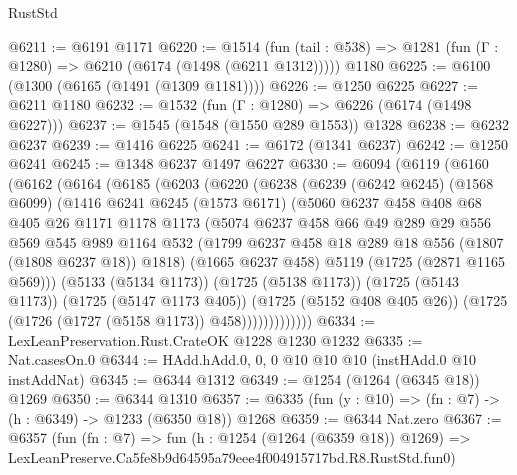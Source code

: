 \begin{lexlean}{RustStd}
\begin{coremodule}
@6211 := @6191 @1171
@6220 := @1514
    (fun (tail : @538) => @1281 (fun (Γ : @1280) => @6210 (@6174 (@1498 (@6211 @1312)))))
    @1180
@6225 := @6100 (@1300 (@6165 (@1491 (@1309 @1181))))
@6226 := @1250 @6225
@6227 := @6211 @1180
@6232 := @1532 (fun (Γ : @1280) => @6226 (@6174 (@1498 @6227)))
@6237 := @1545 (@1548 (@1550 @289 @1553)) @1328
@6238 := @6232 @6237
@6239 := @1416 @6225
@6241 := @6172 (@1341 @6237)
@6242 := @1250 @6241
@6245 := @1348 @6237 @1497 @6227
@6330 := @6094
    (@6119
      (@6160
        (@6162
          (@6164
            (@6185
              (@6203
                (@6220
                  (@6238
                    (@6239
                      (@6242 @6245)
                      (@1568 @6099)
                      (@1416
                        @6241
                        @6245
                        (@1573 @6171)
                        (@5060
                          @6237
                          @458
                          @408
                          @68
                          @405
                          @26
                          @1171
                          @1178
                          @1173
                          (@5074
                            @6237
                            @458
                            @66
                            @49
                            @289
                            @29
                            @556
                            @569
                            @545
                            @989
                            @1164
                            @532
                            (@1799 @6237 @458 @18 @289 @18 @556 (@1807 (@1808 @6237 @18)) @1818)
                            (@1665 @6237 @458)
                            @5119
                            (@1725 (@2871 @1165 @569)))
                          (@5133 (@5134 @1173))
                          (@1725 (@5138 @1173))
                          (@1725 (@5143 @1173))
                          (@1725 (@5147 @1173 @405))
                          (@1725 (@5152 @408 @405 @26))
                          (@1725 (@1726 (@1727 (@5158 @1173)) @458)))))))))))))
@6334 := LexLeanPreservation.Rust.CrateOK @1228 @1230 @1232
@6335 := Nat.casesOn.{0}
@6344 := HAdd.hAdd.{0, 0, 0} @10 @10 @10 (instHAdd.{0} @10 instAddNat)
@6345 := @6344 @1312
@6349 := @1254 (@1264 (@6345 @18)) @1269
@6350 := @6344 @1310
@6357 := @6335 (fun (y : @10) => (fn : @7) -> (h : @6349) -> @1233 (@6350 @18)) @1268
@6359 := @6344 Nat.zero
@6367 := @6357
    (fun (fn : @7) =>
    fun (h : @1254 (@1264 (@6359 @18)) @1269) =>
    LexLeanPreserve.Ca5fe8b9d64595a79eee4f004915717bd.R8.RustStd.fun0)

\end{coremodule}
\end{lexlean}
